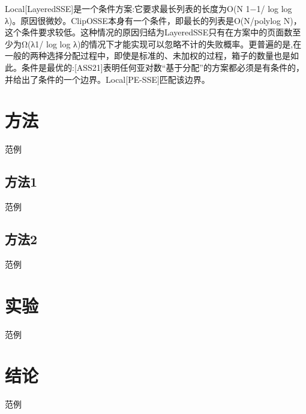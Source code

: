 \documentclass[UTF8]{article}
\begin{document}
Local[LayeredSSE]是一个条件方案:它要求最长列表的长度为O(N 1−1/ log log λ)。原因很微妙。ClipOSSE本身有一个条件，即最长的列表是O(N/polylog N)，这个条件要求较低。这种情况的原因归结为LayeredSSE只有在方案中的页面数至少为Ω(λ1/ log log λ)的情况下才能实现可以忽略不计的失败概率。更普遍的是,在一般的两种选择分配过程中，即使是标准的、未加权的过程，箱子的数量也是如此。条件是最优的:[ASS21]表明任何亚对数“基于分配”的方案都必须是有条件的，并给出了条件的一个边界。Local[PE-SSE]匹配该边界。

\section{方法}
范例
\subsection{方法1}
范例
\subsection{方法2}
范例
\section{实验}
范例
\section{结论}
范例



\end{document}
